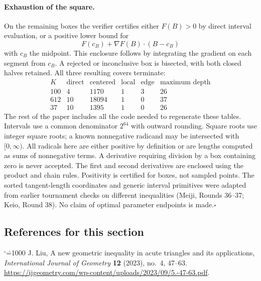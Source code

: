 \documentclass[11pt,a4paper]{article}
\makeatletter
\numberwithin{equation}{section}
\theoremstyle{definition}
\theoremstyle{remark}
\renewenvironment{thebibliography}[1]
 {\subsection*{References for this section}\small
  \list{\@biblabel{\@arabic\c@enumiv}}
       {\settowidth\labelwidth{\@biblabel{#1}}\leftmargin\labelwidth
        \advance\leftmargin\labelsep\@openbib@code
        \usecounter{enumiv}\let\p@enumiv\@empty
        \renewcommand\theenumiv{\@arabic\c@enumiv}}
  \sloppy\clubpenalty4000\widowpenalty4000\sfcode`\.=1000\relax}
 {\def\@noitemerr{\@latex@warning{Empty bibliography}}\endlist}
\makeatother
\begin{document}
\paragraph{Exhaustion of the square.}
On the remaining boxes the verifier certifies either $F(B)>0$ by direct interval evaluation, or a positive lower bound for
\[
               F(c_B)+\nabla F(B)\mathbin{\cdot}(B-c_B)
\]
with $c_B$ the midpoint. This enclosure follows by integrating the gradient on each segment from $c_B$. A rejected or inconclusive box is bisected, with both closed halves retained. All three resulting covers terminate:
\[
\begin{array}{r|rrrr|r}
 K&\text{direct}&\text{centered}&\text{local}&\text{edge}&\text{maximum depth}\\\hline
100&4&1170&1&3&26\\
612&10&18094&1&0&37\\
37&10&1395&1&0&26
\end{array}
\]
The rest of the paper includes all the code needed to regenerate these tables. Intervals use a common denominator $2^{64}$ with outward rounding. Square roots use integer square roots; a known nonnegative radicand may be intersected with $[0,\infty)$. All radicals here are either positive by definition or are lengths computed as sums of nonnegative terms. A derivative requiring division by a box containing zero is never accepted. The first and second derivatives are enclosed using the product and chain rules. Positivity is certified for boxes, not sampled points. The sorted tangent-length coordinates and generic interval primitives were adapted from earlier tournament checks on different inequalities (Meiji, Rounds 36--37; Keio, Round 38). No claim of optimal parameter endpoints is made.\hfill$\square$

\begin{thebibliography}{1}
 J. Liu, A new geometric inequality in acute triangles and its applications, \emph{International Journal of Geometry} \textbf{12} (2023), no.~4, 47--63. \url{https://ijgeometry.com/wp-content/uploads/2023/09/5.-47-63.pdf}.
\end{thebibliography}
\end{document}
